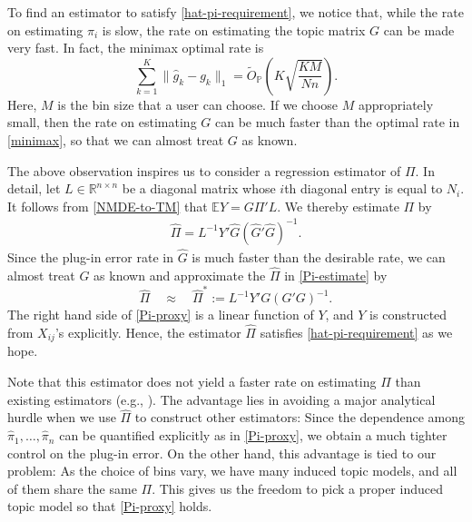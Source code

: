 \documentclass[preprint,11pt]{article}
\newcommand{\zy}[1]{{\color{red}\bf[ZY: #1]}}
\numberwithin{equation}{section}
\newcommand{\beq}{\begin{equation}}
\newcommand{\eeq}{\end{equation}}
\begin{document}
To find an estimator to satisfy \eqref{hat-pi-requirement}, we notice that, while the rate on estimating $\pi_i$ is slow, the rate on estimating the topic matrix $G$ can be made very fast. In fact, the minimax optimal rate \citep{ke2024using,bing2020fast} is 
\beq \label{TM-minimax-rate}
\sum_{k=1}^K\|\hat{g}_k-g_k\|_1 =\widetilde{O}_{\mathbb{P}}\left( K\sqrt{\frac{KM}{Nn}}\right).  %
\eeq
Here, $M$ is the bin size that a user can choose. If we choose $M$ appropriately small, then the rate on estimating $G$ can be much faster than the optimal rate in \eqref{minimax}, 
so that we can almost treat $G$ as known. 

The above observation inspires us to consider a regression estimator of $\Pi$. In detail, let $L\in\mathbb{R}^{n\times n}$ be a diagonal matrix whose $i$th diagonal entry is equal to $N_i$. It follows from \eqref{NMDE-to-TM} that $\mathbb{E}Y = G\Pi'L$. We thereby estimate $\Pi$ by
\begin{align}\label{Pi-estimate}
\widehat{\Pi}= L^{-1}Y'\widehat{G}(\widehat{G}'\widehat{G})^{-1}. 
\end{align}
Since the plug-in error rate in $\widehat{G}$ is much faster than the desirable rate,  we can almost treat $G$ as known and approximate the $\widehat{\Pi}$ in \eqref{Pi-estimate} by 
\beq \label{Pi-proxy}
\widehat{\Pi}\quad \approx\quad \widehat{\Pi}^*:= L^{-1}Y'G(G'G)^{-1}. 
\eeq
The right hand side of \eqref{Pi-proxy} is a linear function of $Y$, and $Y$ is constructed from $X_{ij}$'s explicitly. Hence, the estimator $\widehat{\Pi}$ satisfies \eqref{hat-pi-requirement} as we hope. 

Note that this estimator does not yield a faster rate on estimating $\Pi$ than existing estimators (e.g., \cite{klopp2023assigning,wu2023sparse}). The advantage lies in avoiding a major analytical hurdle when we use $\widehat{\Pi}$ to construct other estimators: Since the dependence among $\hat{\pi}_1, \ldots, \hat{\pi}_n$ can be quantified explicitly as in \eqref{Pi-proxy}, we obtain a much tighter control on the plug-in error. 
On the other hand, this advantage is tied to our problem: As the choice of bins vary, we have many induced topic models, and all of them share the same $\Pi$. This gives us the freedom to pick a proper induced topic model so that  \eqref{Pi-proxy} holds. 


\end{document}
